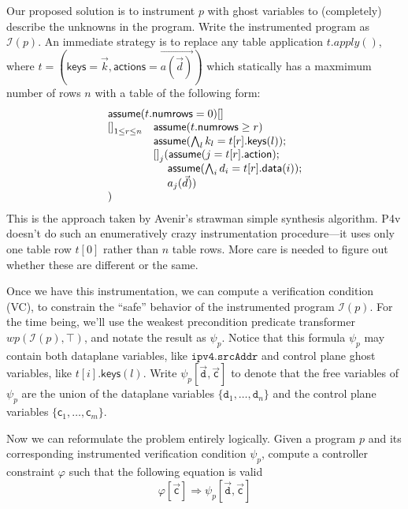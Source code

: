 \documentclass{article}
\newcommand{\MatchRow}{\mathsf{keys}}
\newcommand{\ActionRow}{\mathsf{action}}
\newcommand{\ActionDataRow}{\mathsf{data}}
\begin{document}
Our proposed solution is to instrument $p$ with ghost variables to
(completely) describe the unknowns in the program. Write the
instrumented program as $\mathcal{I}(p)$. An immediate strategy is to
replace any table application $t.\mathit{apply}()$, where
$t = (\mathsf{keys}= \vec k, \mathsf{actions} = \overrightarrow{a(\vec
  d)})$ which statically has a maxmimum number of rows $n$ with a
table of the following form:
\[
  \begin{array}{ll}
    \multicolumn{2}{l}{\mathsf{assume} (t.\mathsf{numrows} = 0) []}\\
    {[]}_{1 \leq r \leq n}
    & \mathsf{assume}(t.\mathsf{numrows} \geq r)\\
    & \mathsf{assume}(\bigwedge_l k_l = t[r].\MatchRow(l)); \\
    & {[]}_j (\mathsf{assume}(j = t[r].\ActionRow); \\
    & \quad\; \mathsf{assume}(\bigwedge_i d_i = t[r].\ActionDataRow(i)); \\
    & \quad\; a_j(\vec d)) \\
    ) 
  \end{array}
\]
This is the approach taken by Avenir's strawman simple synthesis
algorithm. P4v doesn't do such an enumeratively crazy instrumentation
procedure---it uses only one table row $t[0]$ rather than $n$ table
rows. More care is needed to figure out whether these are different or
the same.

Once we have this instrumentation, we can compute a verification
condition (VC), to constrain the ``safe'' behavior of the instrumented
program $\mathcal{I}(p)$. For the time being, we'll use the weakest
precondition predicate transformer
$\mathit{wp}(\mathcal{I}(p), \top)$, and notate the result as
$\psi_p$. Notice that this formula $\psi_p$ may contain both
dataplane variables, like $\texttt{ipv4.srcAddr}$ and control plane
ghost variables, like $t[i].\MatchRow(l)$. Write
$\psi_p[\vec{\texttt{d}},\vec{\mathsf{c}}]$ to denote that the free
variables of $\psi_p$ are the union of the dataplane variables
$\{\texttt{d}_1, \ldots,\texttt{d}_n\}$ and the control plane variables
$\{\mathsf{c}_1, \ldots, \mathsf{c}_m\}$.

Now we can reformulate the problem entirely logically. Given a program
$p$ and its corresponding instrumented verification condition
$\psi_p$, compute a controller constraint $\varphi$ such that the following equation is valid
\[\varphi[\vec{\mathsf{c}}] \Rightarrow \psi_p[\vec{\texttt{d}},\vec{\mathsf{c}}] \]
\end{document}
